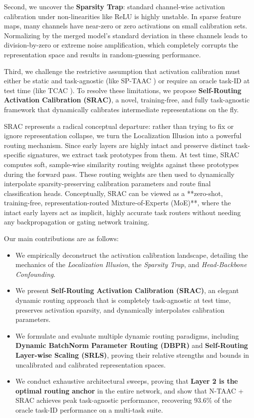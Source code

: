 \documentclass{article}
\theoremstyle{plain}
\theoremstyle{definition}
\theoremstyle{remark}
\begin{document}
Second, we uncover the \textbf{Sparsity Trap}: standard channel-wise activation calibration under non-linearities like ReLU is highly unstable. In sparse feature maps, many channels have near-zero or zero activations on small calibration sets. Normalizing by the merged model's standard deviation in these channels leads to division-by-zero or extreme noise amplification, which completely corrupts the representation space and results in random-guessing performance.

Third, we challenge the restrictive assumption that activation calibration must either be static and task-agnostic (like SP-TAAC \cite{submission8}) or require an oracle task-ID at test time (like TCAC \cite{submission3}). To resolve these limitations, we propose \textbf{Self-Routing Activation Calibration (SRAC)}, a novel, training-free, and fully task-agnostic framework that dynamically calibrates intermediate representations on the fly. 

SRAC represents a radical conceptual departure: rather than trying to fix or ignore representation collapse, we turn the Localization Illusion into a powerful routing mechanism. Since early layers are highly intact and preserve distinct task-specific signatures, we extract task prototypes from them. At test time, SRAC computes soft, sample-wise similarity routing weights against these prototypes during the forward pass. These routing weights are then used to dynamically interpolate sparsity-preserving calibration parameters and route final classification heads. Conceptually, SRAC can be viewed as a **zero-shot, training-free, representation-routed Mixture-of-Experts (MoE)**, where the intact early layers act as implicit, highly accurate task routers without needing any backpropagation or gating network training.

Our main contributions are as follows:
\begin{itemize}
  \item We empirically deconstruct the activation calibration landscape, detailing the mechanics of the \emph{Localization Illusion}, the \emph{Sparsity Trap}, and \emph{Head-Backbone Confounding}.
  \item We present \textbf{Self-Routing Activation Calibration (SRAC)}, an elegant dynamic routing approach that is completely task-agnostic at test time, preserves activation sparsity, and dynamically interpolates calibration parameters.
  \item We formulate and evaluate multiple dynamic routing paradigms, including \textbf{Dynamic BatchNorm Parameter Routing (DBPR)} and \textbf{Self-Routing Layer-wise Scaling (SRLS)}, proving their relative strengths and bounds in uncalibrated and calibrated representation spaces.
  \item We conduct exhaustive architectural sweeps, proving that \textbf{Layer 2 is the optimal routing anchor} in the entire network, and show that N-TAAC + SRAC achieves peak task-agnostic performance, recovering 93.6\% of the oracle task-ID performance on a multi-task suite.
\end{itemize}
\end{document}
